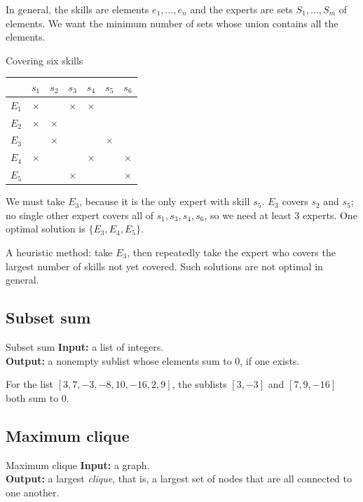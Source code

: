\documentclass[a4paper,12pt,oneside]{report}
\begin{document}
In general, the skills are elements $e_1,\ldots,e_n$ and the experts
are sets $S_1,\ldots,S_m$ of elements. We want the minimum number of
sets whose union contains all the elements.

\begin{framedexample}{Covering six skills}\label{ex:set-cover}
\begin{center}
\begin{tabular}{c|cccccc}
      & $s_1$ & $s_2$ & $s_3$ & $s_4$ & $s_5$ & $s_6$\\
  \hline
  $E_1$ & $\times$ &  & $\times$ & $\times$ &  & \\
  $E_2$ & $\times$ & $\times$ &  &  &  & \\
  $E_3$ &  & $\times$ &  &  & $\times$ & \\
  $E_4$ & $\times$ &  &  & $\times$ &  & $\times$\\
  $E_5$ &  &  & $\times$ &  &  & $\times$
\end{tabular}
\end{center}
We must take $E_3$, because it is the only expert with skill $s_5$.
$E_3$ covers $s_2$ and $s_5$; no single other expert covers all of
$s_1,s_3,s_4,s_6$, so we need at least $3$ experts. One optimal
solution is $\{E_3,E_4,E_5\}$.
\end{framedexample}

A heuristic method: take $E_3$, then repeatedly take the expert who
covers the largest number of skills not yet covered. Such solutions
are not optimal in general.

\subsection{Subset sum}

\begin{framedproblem}{Subset sum}\label{prob:subset-sum}
\textbf{Input:} a list of integers.\\
\textbf{Output:} a nonempty sublist whose elements sum to $0$, if one
exists.
\end{framedproblem}

For the list $[3,7,-3,-8,10,-16,2,9]$, the sublists $[3,-3]$ and
$[7,9,-16]$ both sum to $0$.

\subsection{Maximum clique}

\begin{framedproblem}{Maximum clique}\label{prob:max-clique}
\textbf{Input:} a graph.\\
\textbf{Output:} a largest \emph{clique}, that is, a largest set of
nodes that are all connected to one another.
\end{framedproblem}
\end{document}
